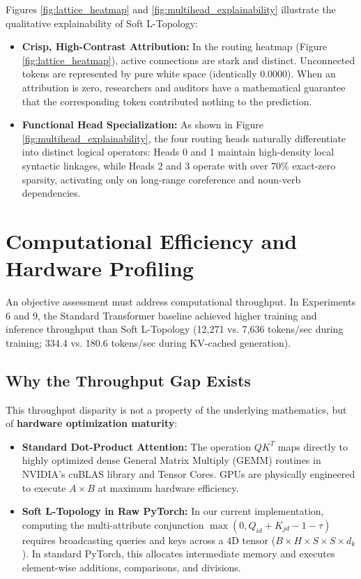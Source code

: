Figures \ref{fig:lattice_heatmap} and \ref{fig:multihead_explainability} illustrate the qualitative explainability of Soft L-Topology:
\begin{itemize}
    \item \textbf{Crisp, High-Contrast Attribution:} In the routing heatmap (Figure \ref{fig:lattice_heatmap}), active connections are stark and distinct. Unconnected tokens are represented by pure white space (identically 0.0000). When an attribution is zero, researchers and auditors have a mathematical guarantee that the corresponding token contributed nothing to the prediction.
    \item \textbf{Functional Head Specialization:} As shown in Figure \ref{fig:multihead_explainability}, the four routing heads naturally differentiate into distinct logical operators: Heads 0 and 1 maintain high-density local syntactic linkages, while Heads 2 and 3 operate with over 70\% exact-zero sparsity, activating only on long-range coreference and noun-verb dependencies.
\end{itemize}

\section{Computational Efficiency and Hardware Profiling}
An objective assessment must address computational throughput. In Experiments 6 and 9, the Standard Transformer baseline achieved higher training and inference throughput than Soft L-Topology (12,271 vs. 7,636 tokens/sec during training; 334.4 vs. 180.6 tokens/sec during KV-cached generation).

\subsection{Why the Throughput Gap Exists}
This throughput disparity is not a property of the underlying mathematics, but of \textbf{hardware optimization maturity}:
\begin{itemize}
    \item \textbf{Standard Dot-Product Attention:} The operation $Q K^T$ maps directly to highly optimized dense General Matrix Multiply (GEMM) routines in NVIDIA's cuBLAS library and Tensor Cores. GPUs are physically engineered to execute $A \times B$ at maximum hardware efficiency.
    \item \textbf{Soft L-Topology in Raw PyTorch:} In our current implementation, computing the multi-attribute conjunction $\max(0, Q_{id} + K_{jd} - 1 - \tau)$ requires broadcasting queries and keys across a 4D tensor ($B \times H \times S \times S \times d_k$). In standard PyTorch, this allocates intermediate memory and executes element-wise additions, comparisons, and divisions.
\end{itemize}

